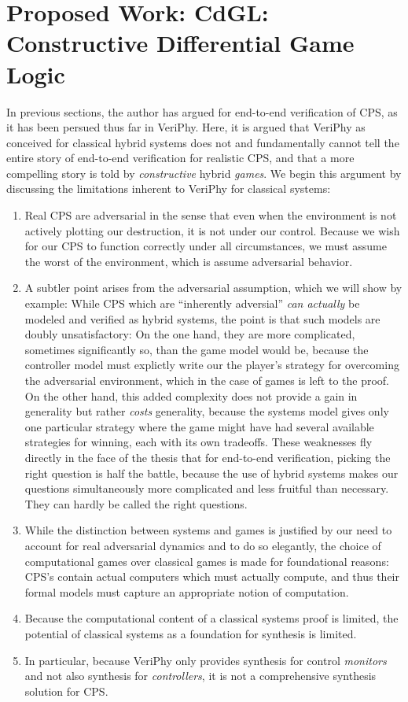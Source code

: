\documentclass[12pt]{cmuthesis}
\theoremstyle{definition}
\theoremstyle{remark}
\newcommand{\CdGL}{\textsf{CdGL}\xspace}
\newcommand{\VeriPhy}{VeriPhy\xspace}
\begin{document}
\chapter{Proposed Work: \CdGL: Constructive Differential Game Logic}
\label{ch:cdgl}
In previous sections, the author has argued for end-to-end verification of CPS, as it has been persued thus far in \VeriPhy.
Here, it is argued that \VeriPhy as conceived for classical hybrid systems does not and fundamentally cannot tell the entire story of end-to-end verification for realistic CPS, and that a more compelling story is told by \emph{constructive} hybrid \emph{games}.
We begin this argument by discussing the limitations inherent to \VeriPhy for classical systems:
\begin{enumerate}
\item \label{item:adversarial} Real CPS are adversarial in the sense that even when the environment is not actively plotting our destruction, it is not under our control.
 Because we wish for our CPS to function correctly under all circumstances, we must assume the worst of the environment, which is assume adversarial behavior.
\item \label{item:complexified} A subtler point arises from the adversarial assumption, which we will show by example:
While CPS which are ``inherently adversial'' \emph{can actually} be modeled and verified as hybrid systems, the point is that such models are doubly unsatisfactory: On the one hand, they are more complicated, sometimes significantly so, than the game model would be, because the controller model must explictly write our the player's strategy for overcoming the adversarial environment, which in the case of games is left to the proof.
On the other hand, this added complexity does not provide a gain in generality but rather \emph{costs} generality, because the systems model gives only one particular strategy where the game might have had several available strategies for winning, each with its own tradeoffs.
These weaknesses fly directly in the face of the thesis that for end-to-end verification, picking the right question is half the battle, because the use of hybrid systems makes our questions simultaneously more complicated and less fruitful than necessary. They can hardly be called the right questions.
\item \label{item:realistic} While the distinction between systems and games is justified by our need to account for real adversarial dynamics and to do so elegantly, 
the choice of computational games over classical games is made for foundational reasons: CPS's contain actual computers which must actually compute, and thus their formal models must capture an appropriate notion of computation.
\item \label{item:computational} Because the computational content of a classical systems proof is limited, the potential of classical systems as a foundation for synthesis is limited.
\item \label{item:control-synthesis} In particular, because \VeriPhy only provides synthesis for control \emph{monitors} and not also synthesis for \emph{controllers}, it is not a comprehensive synthesis solution for CPS.
\end{enumerate}
\end{document}
